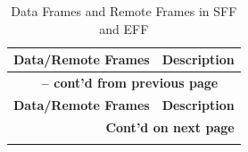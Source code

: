\begin{longtable}[c]{|p{3.5cm}|p{12cm}|} 
    
  \caption{Data Frames and Remote Frames in SFF and EFF}
  \label{tab:twai-data-frames-and-remote-frames} 
  \\\hline
  \rowcolor{lightgray}
  \textbf{Data/Remote Frames} & \textbf{Description}
  \\\hline
  \endfirsthead
  
  \multicolumn{2}{c}{\bfseries \tablename\ \thetable{} -- cont'd from previous page}\\  \hline
  
  \rowcolor{lightgray}
    \textbf{Data/Remote Frames} & \textbf{Description}
  \\\hline
  \endhead
  
  \multicolumn{2}{r}{\textbf{Cont'd on next page}} \\
  \endfoot
  \endlastfoot
  

\end{longtable}
